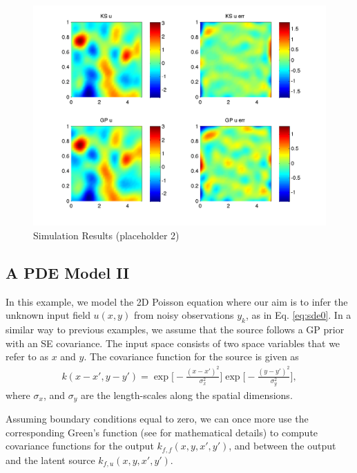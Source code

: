 \documentclass[journal]{IEEEtran}
\begin{document}
\begin{figure}[!t]
\centering
\includegraphics[width=\columnwidth]{placeholder2}
\caption{Simulation Results (placeholder 2)}
\label{fig_sim}
\end{figure}

\subsection{A PDE Model II}

In this example, we model the 2D Poisson equation where our aim is to infer the unknown input field $u(x,y)$ from noisy
observations $y_k$, as in Eq. \eqref{eq:sde0}. In a similar way to previous examples, we assume that the source follows
a GP prior with an SE covariance. The input space consists of two space variables that we refer to as $x$
and $y$. The covariance function for the source is given as
\begin{align*}
k(x-x', y -y') = \exp\Bigg[-\frac{(x-x')^2}{\sigma^2_x}\Bigg]\exp\Bigg[-\frac{(y-y')^2}{\sigma^2_y}\Bigg],
\end{align*}
where $\sigma_x$, and $\sigma_y$ are the length-scales along the
spatial dimensions.

Assuming boundary conditions equal to zero, we can once more use the corresponding Green's function (see
\cite{Polyanin:Handbook02} for mathematical details) to compute covariance functions for the output
$k_{f,f}(x,y,x',y')$, and between the output and the latent source $k_{f,u}(x,y,x',y')$.
\end{document}
